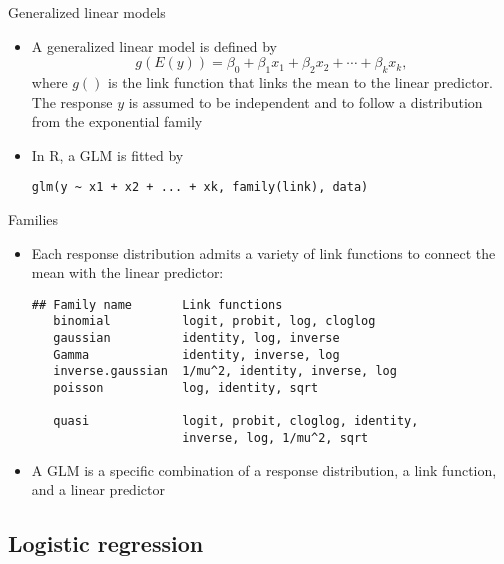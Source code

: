 \documentclass[aspectratio=169]{beamer}
\begin{document}
\begin{frame}[fragile]{Generalized linear models}
  \begin{itemize}
    \item A generalized linear model is defined by
\[
  g(E(y)) = \beta_0 + \beta_1 x_1 + \beta_2 x_2 + \cdots + \beta_k x_k,
\]
where $g()$ is the link function that links the mean to the linear predictor.
The response $y$ is assumed to be independent and to follow a distribution
from the exponential family

\item In R, a GLM is fitted by

  \begin{lstlisting}[style=plain]
  glm(y ~ x1 + x2 + ... + xk, family(link), data)
\end{lstlisting}
  \end{itemize}
\end{frame}

\begin{frame}[fragile]{Families}
  \begin{itemize}
    \item Each response distribution admits a variety of link functions to
      connect the mean with the linear predictor:

  \begin{lstlisting}[style=plain]
## Family name       Link functions
   binomial          logit, probit, log, cloglog
   gaussian          identity, log, inverse
   Gamma             identity, inverse, log
   inverse.gaussian  1/mu^2, identity, inverse, log
   poisson           log, identity, sqrt

   quasi             logit, probit, cloglog, identity,
                     inverse, log, 1/mu^2, sqrt
\end{lstlisting}
\item A GLM is a specific combination of a response distribution, a link
  function, and a linear predictor
  \end{itemize}
\end{frame}

\subsection{Logistic regression}
\end{document}
